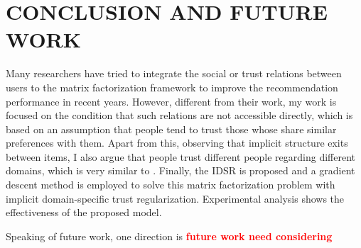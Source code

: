 \section{CONCLUSION AND FUTURE WORK}
Many researchers have tried to integrate the social or trust relations between users to the matrix factorization framework to improve the recommendation performance in recent years. However, different from their work, my work is focused on the condition that such relations are not accessible directly, which is based on an assumption that people tend to trust those whose share similar preferences with them. Apart from this, observing that implicit structure exits between items, I also argue that people trust different people regarding different domains, which is very similar to \cite{yang2012circle}. Finally, the IDSR is proposed and a gradient descent method is employed to solve this matrix factorization problem with implicit domain-specific trust regularization. Experimental analysis shows the effectiveness of the proposed model.

Speaking of future work, one direction is 
\textcolor{red}{\bf future work need considering}